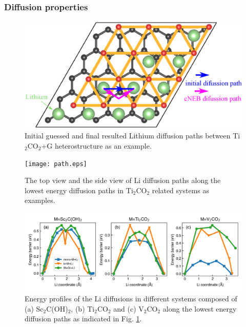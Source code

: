 \subsubsection{Diffusion properties}

\begin{figure}[htb]
\centering
\includegraphics[width=0.8\linewidth]{sites_path.eps}%
\caption{Initial guessed and final resulted Lithium diffusion paths between Ti$_2$CO$_2$+G heterostructure as an example. }
\end{figure}

\begin{figure}[htb]
\centering
\texttt{[image: path.eps]}%
\caption{The top view and the side view of Li diffusion paths along the lowest energy diffusion paths in Ti$_2$CO$_2$ related systems as examples. \label{path}}
\end{figure}

\begin{figure}
\centering
\includegraphics[width=\linewidth]{Li_barrier.png}%
\caption{Energy profiles of the Li diffusions in different systems composed of (a) Sc$_2$C(OH)$_2$, (b) Ti$_2$CO$_2$ and (c) V$_2$CO$_2$ along the lowest energy diffusion paths as indicated in Fig. \ref{path}. \label{barrier}}
\end{figure}

